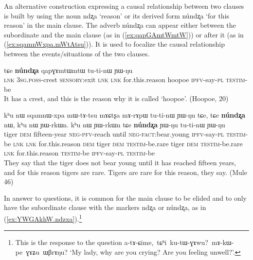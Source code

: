 \documentclass[oldfontcommands,oneside,a4paper,11pt]{article}
\newcommand{\ipa}[1]{{\phon \mbox{#1}}} %
\newcommand{\refb}[1]{(\ref{#1})}
\begin{document}
An alternative construction expressing a causal relationship between two clauses  is built by using the  noun  \ipa{ndʐa} `reason' or its derived form \ipa{núndʐa} `for this reason' in the main clause. The adverb \ipa{núndʐa} can appear either between the subordinate and  the main clause (as in \refb{ex:qapGAmtWmtW}) or after it (as in \refb{ex:sqamnWxpa.mWtAtsu}). It is used to focalize the causal relationship between the events/situations of the two clauses.  

\begin{exe}
\ex \label{ex:qapGAmtWmtW}
\gll
[\ipa{tɕe}  	\ipa{ɯ-mtɯ}  	\ipa{ɣɤʑu}]  	\ipa{tɕe,}  	\ipa{tɕe}  	\textbf{\ipa{núndʐa}}  	\ipa{qapɣɤmtɯmtɯ}  	\ipa{tu-ti-nɯ}  	\ipa{ɲɯ-ŋu}   \\
\textsc{lnk} \textsc{3sg.poss}-crest \textsc{sensory}:exit \textsc{lnk} \textsc{lnk} for.this.reason hoopoe \textsc{ipfv}-say-\textsc{pl} \textsc{testim}-be \\
\glt It has a crest, and this is the reason why it is called `hoopoe'. (Hoopoe, 20)
\end{exe}


\begin{exe}
\ex \label{ex:sqamnWxpa.mWtAtsu}
\gll
\ipa{kʰu}  	\ipa{nɯ}  	\ipa{sqamnɯ-xpa}  	\ipa{mɯ-tɤ-tsu}  	\ipa{mɤɕtʂa}  	\ipa{mɤ-rɤpɯ}  	\ipa{tu-ti-nɯ}  	\ipa{ɲɯ-ŋu}  	\ipa{tɕe,}  	\ipa{tɕe}  	\textbf{\ipa{núndʐa}}  	\ipa{nɯ,}  	\ipa{kʰu}  	\ipa{nɯ}  	\ipa{ɲɯ-rkɯn.}  	\ipa{kʰu}  	\ipa{nɯ}  	\ipa{ɲɯ-rkɯn}  	\ipa{tɕe}  	\textbf{\ipa{núndʐa}}  	\ipa{ɲɯ-ŋu}  	\ipa{tu-ti-nɯ}  	\ipa{ɲɯ-ŋu}  \\
tiger \textsc{dem} fifteen-year \textsc{neg-pfv}-reach until \textsc{neg-fact}:bear.young \textsc{ipfv}-say-\textsc{pl} \textsc{testim}-be \textsc{lnk} \textsc{lnk} for.this.reason \textsc{dem} tiger \textsc{dem} \textsc{testim}-be.rare tiger \textsc{dem} \textsc{testim}-be.rare \textsc{lnk} for.this.reason \textsc{testim}-be \textsc{ipfv}-say-\textsc{pl} \textsc{testim}-be
\\
\glt They say that the tiger does not bear young until it has reached fifteen years, and for this reason tigers are rare. Tigers are rare for this reason, they say. (Mule 46)
\end{exe} 
In answer to questions, it is common for the main clause to be elided and to only have the subordinate clause with the markers \ipa{ndʐa} or \ipa{núndʐa}, as in \refb{ex:YWGAkhW.ndzxa}.\footnote{This is the response to the question \ipa{a-tɤ-ɕime, tɕʰi ku-tɯ-ɣɤwu? mɤ-kɯ-pe ɣɤʑu ɯβrɤŋu?} `My lady, why are you crying? Are you feeling unwell?'.}
\end{document}
